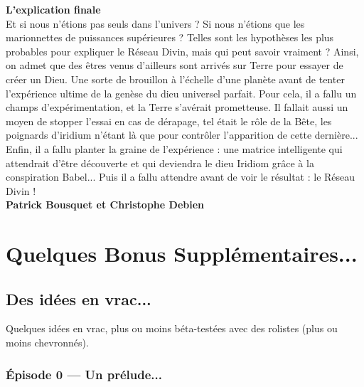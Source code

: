 \documentclass[11pt,twoside,a4paper]{book}
\begin{document}
\textbf{\Large L'explication finale}~\\

Et si nous n'{\'e}tions pas seuls dans l'univers ? Si nous n'{\'e}tions que les marionnettes de puissances sup{\'e}rieures ? Telles sont les hypoth{\`e}ses les plus probables pour expliquer le R{\'e}seau Divin, mais qui peut savoir vraiment ? Ainsi, on admet que des {\^e}tres venus d'ailleurs sont arriv{\'e}s sur Terre pour essayer de cr{\'e}er un Dieu. Une sorte de brouillon {\`a} l'{\'e}chelle d'une plan{\`e}te avant de tenter l'exp{\'e}rience ultime de la gen{\`e}se du dieu universel parfait. Pour cela, il a fallu un champs d'exp{\'e}rimentation, et la Terre s'av{\'e}rait prometteuse. Il fallait aussi un moyen de stopper l'essai en cas de d{\'e}rapage, tel {\'e}tait le r{\^o}le de la B{\^e}te, les poignards d'iridium n'{\'e}tant l{\`a} que pour contr{\^o}ler l'apparition de cette derni{\`e}re... Enfin, il a fallu planter la graine de l'exp{\'e}rience : une matrice intelligente qui attendrait d'{\^e}tre d{\'e}couverte et qui deviendra le dieu Iridiom gr{\^a}ce {\`a} la conspiration Babel... Puis il a fallu attendre avant de voir le r{\'e}sultat : le R{\'e}seau Divin ! ~\\

\textbf{Patrick Bousquet et Christophe Debien}~\\

\clearpage 

\part*{Quelques Bonus Suppl{\'e}mentaires...}

\chapter*{Des id{\'e}es en vrac...}

Quelques id{\'e}es en vrac, plus ou moins b{\'e}ta-test{\'e}es avec des rolistes (plus ou moins chevronn{\'e}s). 

\section*{{\'E}pisode 0 --- Un pr{\'e}lude...}
\end{document}
